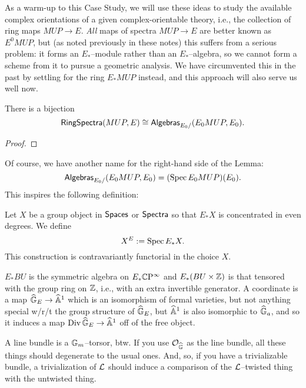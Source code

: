 As a warm-up to this Case Study, we will use these ideas to study the available complex orientations of a given complex-orientable theory, i.e., the collection of ring maps $MUP \to E$.  \emph{All} maps of spectra $MUP \to E$ are better known as $E^0 MUP$, but (as noted previously in these notes) this suffers from a serious problem: it forms an $E_*$--module rather than an $E_*$--algebra, so we cannot form a scheme from it to pursue a geometric analysis.  We have circumvented this in the past by settling for the ring $E_* MUP$ instead, and this approach will also serve us well now.

\begin{lemma}
There is a bijection \[\mathsf{RingSpectra}(MUP, E) \cong \mathsf{Algebras}_{E_0/}(E_0 MUP, E_0).\]
\end{lemma}
\begin{proof}
\end{proof}

Of course, we have another name for the right-hand side of the Lemma: \[\mathsf{Algebras}_{E_0/}(E_0 MUP, E_0) = (\operatorname{Spec} E_0 MUP)(E_0).\]  This inspires the following definition:

\begin{definition}
Let $X$ be a group object in $\mathsf{Spaces}$ or $\mathsf{Spectra}$ so that $E_* X$ is concentrated in even degrees.  We define \[X^E := \operatorname{Spec} E_* X.\]  This construction is contravariantly functorial in the choice $X$.
\end{definition}


$E_* BU$ is the symmetric algebra on $E_* \mathbb{C}\mathrm P^\infty$ and $E_* (BU \times \mathbb Z)$ is that tensored with the group ring on $\mathbb Z$, i.e., with an extra invertible generator.  A coordinate is a map $\widehat{\mathbb G}_E \to \widehat{\mathbb{A}}^1$ which is an isomorphism of formal varieties, but not anything special w/r/t the group structure of $\widehat{\mathbb G}_E$, but $\widehat{\mathbb{A}}^1$ is also isomorphic to $\widehat{\mathbb G}_a$, and so it induces a map $\operatorname{Div} \widehat{\mathbb G}_E \to \widehat{\mathbb{A}}^1$ off of the free object.

A line bundle is a $\mathbb G_m$--torsor, btw.  If you use $\mathcal{O}_{\widehat{\mathbb G}}$ as the line bundle, all these things should degenerate to the usual ones.  And, so, if you have a trivializable bundle, a trivialization of $\mathcal{L}$ should induce a comparison of the $\mathcal{L}$--twisted thing with the untwisted thing.

